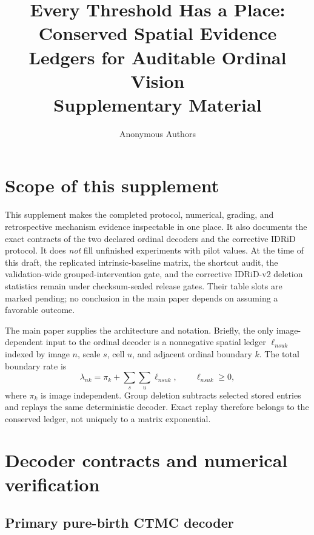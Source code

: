 \documentclass[10pt,twocolumn,letterpaper]{article}
\title{Every Threshold Has a Place:\\
Conserved Spatial Evidence Ledgers for Auditable Ordinal Vision\\
\vspace{3pt}\large Supplementary Material}
\author{Anonymous Authors}
\begin{document}
\maketitle

\section{Scope of this supplement}
\label{sec:scope}

This supplement makes the completed protocol, numerical, grading, and
retrospective mechanism evidence inspectable in one place.  It also documents
the exact contracts of the two declared ordinal decoders and the corrective
IDRiD protocol.  It does \emph{not} fill unfinished experiments with pilot
values.  At the time of this draft, the replicated intrinsic-baseline matrix,
the shortcut audit, the validation-wide grouped-intervention gate, and the
corrective IDRiD-v2 deletion statistics remain under checksum-sealed release
gates.  Their table slots are marked pending; no conclusion in the main paper
depends on assuming a favorable outcome.

The main paper supplies the architecture and notation.  Briefly, the only
image-dependent input to the ordinal decoder is a nonnegative spatial ledger
$\ell_{nsuk}$ indexed by image $n$, scale $s$, cell $u$, and adjacent ordinal
boundary $k$.  The total boundary rate is
\begin{equation}
  \lambda_{nk}=\pi_k+\sum_s\sum_u\ell_{nsuk},
  \qquad \ell_{nsuk}\geq 0,
  \label{eq:supp-ledger}
\end{equation}
where $\pi_k$ is image independent.  Group deletion subtracts selected stored
entries and replays the same deterministic decoder.  Exact replay therefore
belongs to the conserved ledger, not uniquely to a matrix exponential.

\section{Decoder contracts and numerical verification}
\label{sec:decoder-contracts}

\subsection{Primary pure-birth CTMC decoder}
\end{document}
